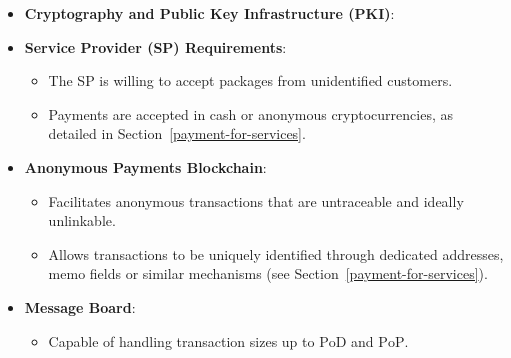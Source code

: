 \documentclass[pdftex,twocolumn,epjc3]{svjour3}
\begin{document}
\begin{itemize}
  \item \textbf{Cryptography and Public Key Infrastructure (PKI)}:

\item \textbf{Service Provider (SP) Requirements}:
  \begin{itemize}
      \item The SP is willing to accept packages from unidentified customers.
      \item Payments are accepted in cash or anonymous cryptocurrencies, as detailed in Section~\ref{payment-for-services}.
   \end{itemize}
  
\item \textbf{Anonymous Payments Blockchain}:
  \begin{itemize}
      \item Facilitates anonymous transactions that are untraceable and ideally unlinkable.
      \item Allows transactions to be uniquely identified through dedicated addresses, memo fields or similar mechanisms (see Section~\ref{payment-for-services}).
  \end{itemize}

\item \textbf{Message Board}:
  \begin{itemize}
      \item Capable of handling transaction sizes up to $\mathrm{PoD}$ and $\mathrm{PoP}$.
  \end{itemize}


\end{itemize}
\end{document}
